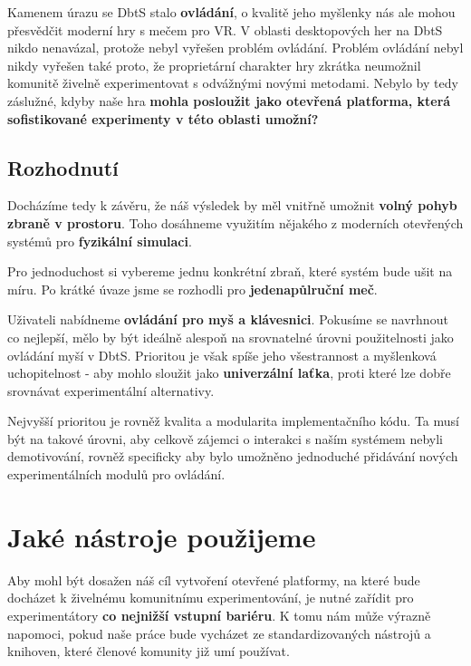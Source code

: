 Kamenem úrazu se \acl{DbtS} stalo \textbf{ovládání}, o kvalitě jeho myšlenky nás ale mohou přesvědčit moderní hry s mečem pro VR. V oblasti desktopových her na \acl{DbtS} nikdo nenavázal, protože nebyl vyřešen problém ovládání. Problém ovládání nebyl nikdy vyřešen také proto, že proprietární charakter hry zkrátka neumožnil komunitě živelně experimentovat s odvážnými novými metodami. Nebylo by tedy záslužné, kdyby naše hra \textbf{mohla posloužit jako otevřená platforma, která sofistikované experimenty v této oblasti umožní?} 

\subsection{Rozhodnutí}

Docházíme tedy k závěru, že náš výsledek by měl vnitřně umožnit \textbf{volný pohyb zbraně v prostoru}. Toho dosáhneme využitím nějakého z moderních otevřených systémů pro \textbf{fyzikální simulaci}.

Pro jednoduchost si vybereme jednu konkrétní zbraň, které systém bude ušit na míru. Po krátké úvaze jsme se rozhodli pro \textbf{jedenapůlruční meč}.

Uživateli nabídneme \textbf{ovládání pro myš a klávesnici}. Pokusíme se navrhnout co nejlepší, mělo by být ideálně alespoň na srovnatelné úrovni použitelnosti jako ovládání myší v \acl{DbtS}. Prioritou je však spíše jeho všestrannost a myšlenková uchopitelnost - aby mohlo sloužit jako \textbf{univerzální laťka}, proti které lze dobře srovnávat experimentální alternativy. 

Nejvyšší prioritou je rovněž kvalita a modularita implementačního kódu. Ta musí být na takové úrovni, aby celkově zájemci o interakci s naším systémem nebyli demotivování, rovněž specificky aby bylo umožněno jednoduché přidávání nových experimentálních modulů pro ovládání.

\section{Jaké nástroje použijeme}

Aby mohl být dosažen náš cíl vytvoření otevřené platformy, na které bude docházet k živelnému komunitnímu experimentování, je nutné zařídit pro experimentátory \textbf{co nejnižší vstupní bariéru}. K tomu nám může výrazně napomoci, pokud naše práce bude vycházet ze standardizovaných nástrojů a knihoven, které členové komunity již umí používat.


